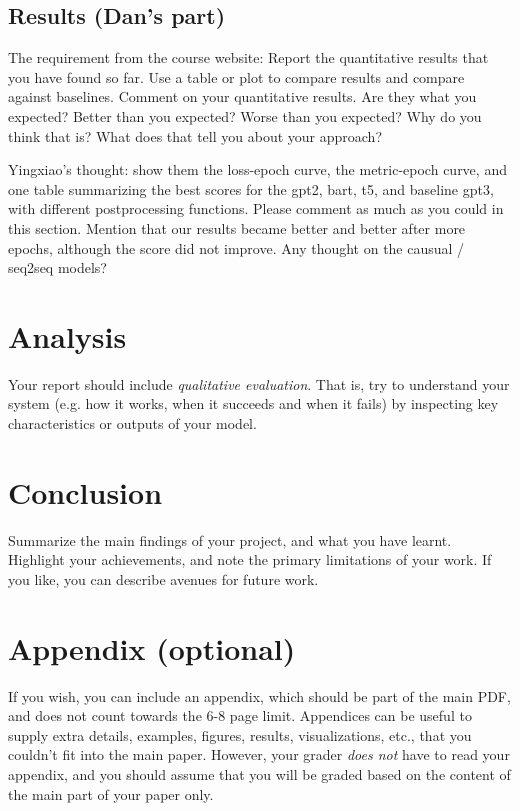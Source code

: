 \documentclass{article}
\begin{document}
\color{red}
\subsection{Results (Dan's part)}
\color{black}
The requirement from the course website: Report the quantitative results that you have found so far. Use a table or plot to compare results and compare against baselines.
Comment on your quantitative results. Are they what you expected? Better than you expected? Worse than you expected? Why do you think that is? What does that tell you about your approach?

Yingxiao's thought: show them the loss-epoch curve, the metric-epoch curve, and one table summarizing the best scores for the gpt2, bart, t5, and baseline gpt3, with different postprocessing functions. Please comment as much as you could in this section. Mention that our results became better and better after more epochs, although the score did not improve. Any thought on the causual / seq2seq models?


\section{Analysis}
Your report should include \textit{qualitative evaluation}. That is, try to understand your system (e.g. how it works, when it succeeds and when it fails) by inspecting key characteristics or outputs of your model.

\section{Conclusion}
Summarize the main findings of your project, and what you have learnt. Highlight your achievements, and note the primary limitations of your work. If you like, you can describe avenues for future work.






\appendix

\section{Appendix (optional)}
If you wish, you can include an appendix, which should be part of the main PDF, and does not count towards the 6-8 page limit.
Appendices can be useful to supply extra details, examples, figures, results, visualizations, etc., that you couldn't fit into the main paper. However, your grader \textit{does not} have to read your appendix, and you should assume that you will be graded based on the content of the main part of your paper only.
\end{document}
